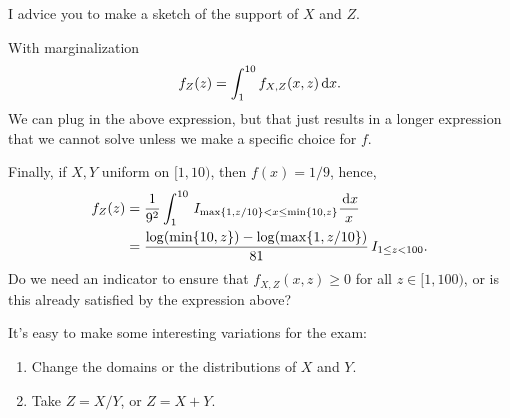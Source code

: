 \documentclass[lectures-questions]{subfiles}
\begin{document}
\begin{exercise}
\begin{solution}
I advice you to make a sketch of the support of $X$ and $Z$.


With marginalization
\begin{equation}
f_{Z}(z) =
\int_{1}^{10} f_{X,Z}(x,z) \,\textrm{d}x.
\end{equation}
We can plug in the above expression, but that just results in a longer expression that we cannot solve unless we make a specific choice for $f$.

Finally, if $X,Y$ uniform on $[1,10)$, then $f(x)=1/9$, hence,
\begin{align}
f_{Z}(z)
&=\frac{1}{9^{2}}\int_{1}^{10}  \,I_{\max\{1, z/10\}< x \leq \min\{10, z\}} \frac{\,\textrm{d}x}{x}\\
&=\frac{\log(\min\{10, z\}) - \log(\max\{1, z/10\})}{81} \,I_{1\leq z < 100}.
\end{align}
Do we need an indicator to ensure that $f_{X,Z}(x,z)\geq0$ for all $z \in [1, 100)$, or is this already satisfied by the expression above?

It's easy to make some interesting variations for the exam:
\begin{enumerate}
\item Change the domains or the distributions of $X$ and $Y$.
\item Take $Z=X/Y$, or $Z=X+Y$.
\end{enumerate}

\end{solution}
\end{exercise}
\end{document}
